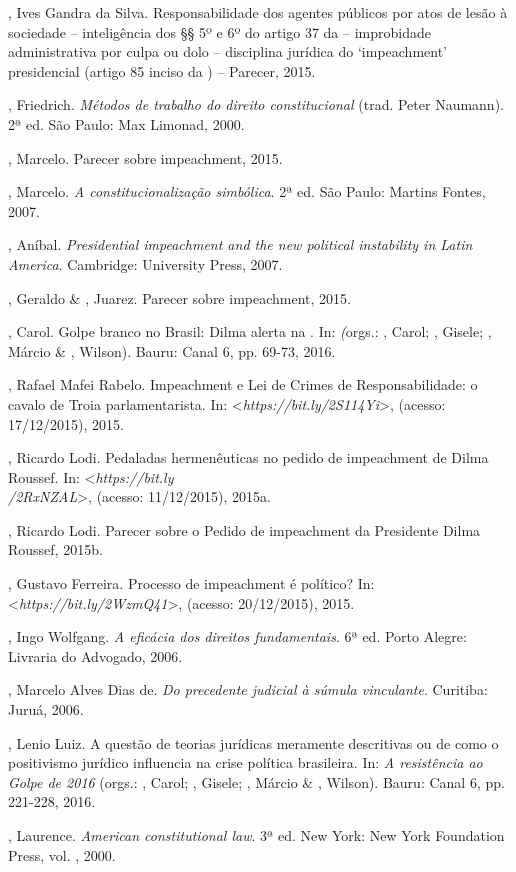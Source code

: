 \begin{Parskip}
, Ives Gandra da Silva. Responsabilidade dos agentes públicos por
atos de lesão à sociedade -- inteligência dos §§ 5º e 6º do artigo 37 da
 -- improbidade administrativa por culpa ou dolo -- disciplina
jurídica do `impeachment' presidencial (artigo 85 inciso  da ) --
Parecer, 2015.

, Friedrich. \emph{Métodos de trabalho do direito constitucional} (trad.
Peter Naumann). 2ª ed. São Paulo: Max Limonad, 2000.

, Marcelo. Parecer sobre impeachment, 2015.

, Marcelo. \emph{A constitucionalização simbólica}. 2ª ed. São Paulo: 
Martins Fontes, 2007.

, Aníbal. \emph{Presidential impeachment and the new political
instability in Latin America}. Cambridge: University Press, 2007.

, Geraldo \& , Juarez. Parecer sobre impeachment,
2015.

, Carol. Golpe branco no Brasil: Dilma alerta na . In: \emph\emph (orgs.: , Carol; , Gisele;
, Márcio \& , Wilson). Bauru: Canal 6, pp. 69-73,
2016.

, Rafael Mafei Rabelo. Impeachment e Lei de Crimes de
Responsabilidade: o cavalo de Troia parlamentarista. In:
\textless{}\emph{https://bit.ly/2S114Yi}\textgreater{},
(acesso: 17/12/2015), 2015.

, Ricardo Lodi. Pedaladas hermenêuticas no pedido de impeachment
de Dilma Roussef. In:
\textless{}\emph{https://bit.ly\\/2RxNZAL}\textgreater{},
(acesso: 11/12/2015), 2015a.

, Ricardo Lodi. Parecer sobre o Pedido de impeachment da
Presidente Dilma Roussef, 2015b.

, Gustavo Ferreira. Processo de impeachment é político? In:
\textless{}\emph{https://bit.ly/2WzmQ41}\textgreater{},
(acesso: 20/12/2015), 2015.

, Ingo Wolfgang. \emph{A eficácia dos direitos fundamentais}. 6ª ed.
Porto Alegre: Livraria do Advogado, 2006.

, Marcelo Alves Dias de. \emph{Do precedente judicial à súmula
vinculante}. Curitiba: Juruá, 2006.

, Lenio Luiz. A questão de teorias jurídicas meramente descritivas
ou de como o positivismo jurídico influencia na crise política
brasileira. In: \emph{A resistência ao Golpe de 2016} (orgs.: , Carol;
, Gisele; , Márcio \& , Wilson). Bauru:
Canal 6, pp. 221-228, 2016.

, Laurence. \emph{American constitutional law}. 3ª ed. New York: New York
Foundation Press, vol. , 2000.
\end{Parskip}

